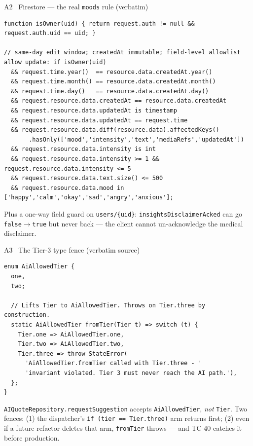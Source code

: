 \documentclass[aspectratio=169,11pt]{beamer}
\begin{document}
\begin{frame}[fragile]{A2 \textperiodcentered\ Firestore --- the real \texttt{moods} rule (verbatim)}
\begin{lstlisting}[style=rulestyle,basicstyle=\ttfamily\tiny]
function isOwner(uid) { return request.auth != null && request.auth.uid == uid; }

// same-day edit window; createdAt immutable; field-level allowlist
allow update: if isOwner(uid)
  && request.time.year()  == resource.data.createdAt.year()
  && request.time.month() == resource.data.createdAt.month()
  && request.time.day()   == resource.data.createdAt.day()
  && request.resource.data.createdAt == resource.data.createdAt
  && request.resource.data.updatedAt is timestamp
  && request.resource.data.updatedAt == request.time
  && request.resource.data.diff(resource.data).affectedKeys()
       .hasOnly(['mood','intensity','text','mediaRefs','updatedAt'])
  && request.resource.data.intensity is int
  && request.resource.data.intensity >= 1 && request.resource.data.intensity <= 5
  && request.resource.data.text.size() <= 500
  && request.resource.data.mood in ['happy','calm','okay','sad','angry','anxious'];
\end{lstlisting}
{\footnotesize Plus a one-way field guard on \texttt{users/\{uid\}}: \texttt{insightsDisclaimerAcked} can go \texttt{false$\to$true} but never back --- the client cannot un-acknowledge the medical disclaimer.}
\end{frame}

\begin{frame}[fragile]{A3 \textperiodcentered\ The Tier-3 type fence (verbatim source)}
\begin{lstlisting}[style=dartstyle]
enum AiAllowedTier {
  one,
  two;

  // Lifts Tier to AiAllowedTier. Throws on Tier.three by construction.
  static AiAllowedTier fromTier(Tier t) => switch (t) {
    Tier.one => AiAllowedTier.one,
    Tier.two => AiAllowedTier.two,
    Tier.three => throw StateError(
      'AiAllowedTier.fromTier called with Tier.three - '
      'invariant violated. Tier 3 must never reach the AI path.'),
  };
}
\end{lstlisting}
{\footnotesize \texttt{AIQuoteRepository.requestSuggestion} accepts \texttt{AiAllowedTier}, \emph{not} \texttt{Tier}. Two fences: (1) the dispatcher's \texttt{if (tier == Tier.three)} arm returns first; (2) even if a future refactor deletes that arm, \texttt{fromTier} throws --- and TC-40 catches it before production.}
\end{frame}
\end{document}
